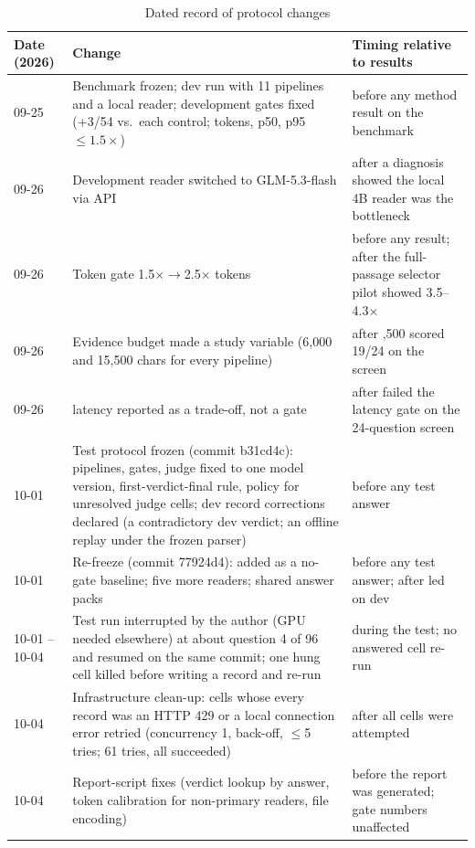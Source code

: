 \begin{table}[tp]
\caption{Dated record of protocol changes}
\label{tab:timeline}
\centering
\scriptsize
\begin{tabularx}{\textwidth}{@{}p{1.6cm}Xp{5.4cm}@{}}
\toprule
Date (2026) & Change & Timing relative to results \\
\midrule
09-25 & Benchmark frozen; dev run with 11 pipelines and a local reader; development gates fixed (+3/54 vs.\ each control; tokens, p50, p95 $\le1.5\times$) & before any method result on the benchmark \\
09-26 & Development reader switched to GLM-5.3-flash via API & after a diagnosis showed the local 4B reader was the bottleneck \\
09-26 & Token gate 1.5$\times\to$2.5$\times$ \hybrid{} tokens & before any \lexb{} result; after the full-passage selector pilot showed 3.5--4.3$\times$ \\
09-26 & Evidence budget made a study variable (6,000 and 15,500 chars for every pipeline) & after \hybrid@15,500 scored 19/24 on the screen \\
09-26 & \lexb{} latency reported as a trade-off, not a gate & after \lexb{} failed the latency gate on the 24-question screen \\
10-01 & Test protocol frozen (commit b31cd4c): pipelines, gates, judge fixed to one model version, first-verdict-final rule, policy for unresolved judge cells; dev record corrections declared (a contradictory dev verdict; an offline replay under the frozen parser) & before any test answer \\
10-01 & Re-freeze (commit 77924d4): \setr{} added as a no-gate baseline; five more readers; shared answer packs & before any test answer; after \setr{} led on dev \\
10-01 -- 10-04 & Test run interrupted by the author (GPU needed elsewhere) at about question 4 of 96 and resumed on the same commit; one hung cell killed before writing a record and re-run & during the test; no answered cell re-run \\
10-04 & Infrastructure clean-up: cells whose every record was an HTTP 429 or a local connection error retried (concurrency 1, back-off, $\le$5 tries; 61 tries, all succeeded) & after all cells were attempted \\
10-04 & Report-script fixes (verdict lookup by answer, token calibration for non-primary readers, file encoding) & before the report was generated; gate numbers unaffected \\

\end{tabularx}
\end{table}
